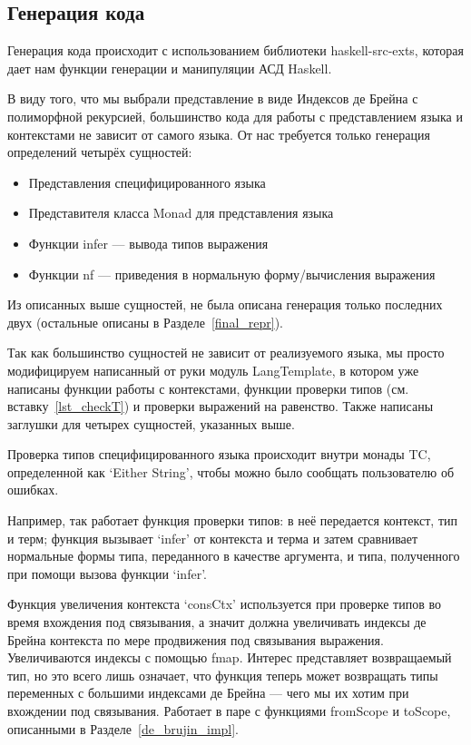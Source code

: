 \subsection{Генерация кода}
Генерация кода происходит с использованием библиотеки haskell-src-exts\cite{src_exts}, которая дает нам функции генерации и манипуляции АСД Haskell.

В виду того, что мы выбрали представление в виде Индексов де Брейна с полиморфной рекурсией, большинство кода для работы с представлением языка и контекстами не зависит от самого языка. От нас требуется только генерация определений четырёх сущностей:

\begin{itemize}
\item Представления специфицированного языка
\item Представителя класса Monad для представления языка
\item Функции infer --- вывода типов выражения
\item Функции nf --- приведения в нормальную форму/вычисления выражения
\end{itemize}

Из описанных выше сущностей, не была описана генерация только последних двух (остальные описаны в Разделе~\ref{final_repr}).

Так как большинство сущностей не зависит от реализуемого языка, мы просто модифицируем написанный от руки модуль LangTemplate, в котором уже написаны функции работы с контекстами, функции проверки типов (см. вставку~\ref{lst_checkT}) и проверки выражений на равенство. Также написаны заглушки для четырех сущностей, указанных выше.

Проверка типов специфицированного языка происходит внутри монады TC, определенной как `Either String', чтобы можно было сообщать пользователю об ошибках.

Например, так работает функция проверки типов: в неё передается контекст, тип и терм; функция вызывает `infer' от контекста и терма и затем сравнивает нормальные формы типа, переданного в качестве аргумента, и типа, полученного при помощи вызова функции `infer'.

Функция увеличения контекста `consCtx' используется при проверке типов во время вхождения под связывания, а значит должна увеличивать индексы де Брейна контекста по мере продвижения под связывания выражения. Увеличиваются индексы с помощью fmap. Интерес представляет возвращаемый тип, но это всего лишь означает, что функция теперь может возвращать типы переменных с большими индексами де Брейна --- чего мы их хотим при вхождении под связывания. Работает в паре с функциями fromScope и toScope, описанными в Разделе~\ref{de_brujin_impl}.

